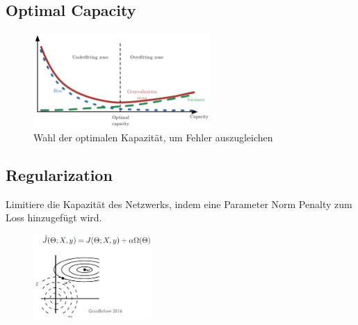 \documentclass[a4paper]{article}
\begin{document}
		\subsection{Optimal Capacity}
		
		\begin{figure}[htb!]
			\centering
			\includegraphics[width=0.6\textwidth]{img/06_deep_nn/optimal_capacity.png}
			\caption{Wahl der optimalen Kapazität, um Fehler auszugleichen}
			\label{fig:06_deep_nn_optimal_capacity}
		\end{figure}
	
		\subsection{Regularization}
	\noindent
		Limitiere die Kapazität des Netzwerks, indem eine Parameter Norm Penalty zum Loss hinzugefügt wird.
		
		\begin{figure}[htb!]
			\centering
			\includegraphics[width=0.4\textwidth]{img/06_deep_nn/regularization.png}
		\end{figure}
	
\end{document}
